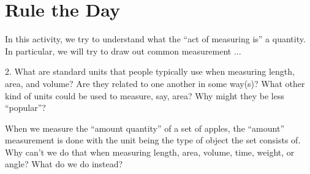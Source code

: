 \newpage
\section{Rule the Day} 
       
In this activity, we try to understand what the ``act of measuring is'' a
quantity. In particular, we will try to draw out common measurement ...

\begin{prob} 
2. What are standard units that people typically use when measuring
length, area, and volume?  Are they related to one another in some
way(s)?  What other kind of units could be used to measure, say, area?
Why might they be less “popular”?
\end{prob}



\begin{prob}
When we measure the ``amount quantity'' of a set of apples, the
``amount'' measurement is done with the unit being the type of object
the set consists of.  Why can't we do that when measuring length,
area, volume, time, weight, or angle?  What do we do instead?
\end{prob}
